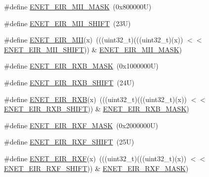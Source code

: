 \begin{DoxyCompactItemize}
\item 
\#define \mbox{\hyperlink{group___e_n_e_t___register___masks_gaa7950e8d1394fd92eb09a2ce4623ab83}{E\+N\+E\+T\+\_\+\+E\+I\+R\+\_\+\+M\+I\+I\+\_\+\+M\+A\+SK}}~(0x800000\+U)
\item 
\#define \mbox{\hyperlink{group___e_n_e_t___register___masks_gad724bdc9149fc578f9c331bdfcef004f}{E\+N\+E\+T\+\_\+\+E\+I\+R\+\_\+\+M\+I\+I\+\_\+\+S\+H\+I\+FT}}~(23\+U)
\item 
\#define \mbox{\hyperlink{group___e_n_e_t___register___masks_ga30a703958873330f2cc14fb7be337769}{E\+N\+E\+T\+\_\+\+E\+I\+R\+\_\+\+M\+II}}(x)~(((uint32\+\_\+t)(((uint32\+\_\+t)(x)) $<$$<$ \mbox{\hyperlink{group___e_n_e_t___register___masks_gad724bdc9149fc578f9c331bdfcef004f}{E\+N\+E\+T\+\_\+\+E\+I\+R\+\_\+\+M\+I\+I\+\_\+\+S\+H\+I\+FT}})) \& \mbox{\hyperlink{group___e_n_e_t___register___masks_gaa7950e8d1394fd92eb09a2ce4623ab83}{E\+N\+E\+T\+\_\+\+E\+I\+R\+\_\+\+M\+I\+I\+\_\+\+M\+A\+SK}})
\item 
\#define \mbox{\hyperlink{group___e_n_e_t___register___masks_gaf8eb82815708cb73c87988dea057aa19}{E\+N\+E\+T\+\_\+\+E\+I\+R\+\_\+\+R\+X\+B\+\_\+\+M\+A\+SK}}~(0x1000000\+U)
\item 
\#define \mbox{\hyperlink{group___e_n_e_t___register___masks_gad60f05312b15d4abba4d24862c5acbcd}{E\+N\+E\+T\+\_\+\+E\+I\+R\+\_\+\+R\+X\+B\+\_\+\+S\+H\+I\+FT}}~(24\+U)
\item 
\#define \mbox{\hyperlink{group___e_n_e_t___register___masks_gad4b1167a4e1f32f6cd841ade9aa78b90}{E\+N\+E\+T\+\_\+\+E\+I\+R\+\_\+\+R\+XB}}(x)~(((uint32\+\_\+t)(((uint32\+\_\+t)(x)) $<$$<$ \mbox{\hyperlink{group___e_n_e_t___register___masks_gad60f05312b15d4abba4d24862c5acbcd}{E\+N\+E\+T\+\_\+\+E\+I\+R\+\_\+\+R\+X\+B\+\_\+\+S\+H\+I\+FT}})) \& \mbox{\hyperlink{group___e_n_e_t___register___masks_gaf8eb82815708cb73c87988dea057aa19}{E\+N\+E\+T\+\_\+\+E\+I\+R\+\_\+\+R\+X\+B\+\_\+\+M\+A\+SK}})
\item 
\#define \mbox{\hyperlink{group___e_n_e_t___register___masks_ga2a20a0e36978d9064e91cce092593fed}{E\+N\+E\+T\+\_\+\+E\+I\+R\+\_\+\+R\+X\+F\+\_\+\+M\+A\+SK}}~(0x2000000\+U)
\item 
\#define \mbox{\hyperlink{group___e_n_e_t___register___masks_ga7b2d30f7f3e517d68feba7edd38c0c9c}{E\+N\+E\+T\+\_\+\+E\+I\+R\+\_\+\+R\+X\+F\+\_\+\+S\+H\+I\+FT}}~(25\+U)
\item 
\#define \mbox{\hyperlink{group___e_n_e_t___register___masks_ga328ea567095167ac8fc913d8f634aeb5}{E\+N\+E\+T\+\_\+\+E\+I\+R\+\_\+\+R\+XF}}(x)~(((uint32\+\_\+t)(((uint32\+\_\+t)(x)) $<$$<$ \mbox{\hyperlink{group___e_n_e_t___register___masks_ga7b2d30f7f3e517d68feba7edd38c0c9c}{E\+N\+E\+T\+\_\+\+E\+I\+R\+\_\+\+R\+X\+F\+\_\+\+S\+H\+I\+FT}})) \& \mbox{\hyperlink{group___e_n_e_t___register___masks_ga2a20a0e36978d9064e91cce092593fed}{E\+N\+E\+T\+\_\+\+E\+I\+R\+\_\+\+R\+X\+F\+\_\+\+M\+A\+SK}})
$$
\end{DoxyCompactItemize}
